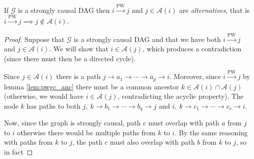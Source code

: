 \documentclass[12pt]{article}
\def\pwgc{\overset{\text{PW}}{\rightarrow}}  %
\def\gcg{\mathcal{G}}  %
\newcommand{\anc}[1]{\mathcal{A}(#1)}  %
\newcommand{\gcgpath}[4]{#1 \rightarrow #2_1 \rightarrow \cdots \rightarrow #2_{#3} \rightarrow #4}
\begin{document}


\begin{lemma}
  If $\gcg$ is a strongly causal DAG then $i \pwgc j$ and $j \in \anc{i}$ are
  \textit{alternatives}, that is $i \pwgc j \implies j \notin \anc{i}$.
\end{lemma}
\begin{proof}
  Suppose that $\gcg$ is a strongly causal DAG and that we have both
  $i \pwgc j$ and $j \in \anc{i}$.  We will show that $i \in \anc{j}$,
  which produces a contradiction (since there must then be a directed cycle).

  Since $j \in \anc{i}$ there is a path $\gcgpath{j}{a}{p}{i}$.
  Moreover, since $i \pwgc j$ by lemma \ref{lem:pwgc_anc} there must
  be a common ancestor $k \in \anc{i} \cap \anc{j}$ (otherwise, we would
  have $i \in \anc{j}$, contradicting the acyclic property).  The node
  $k$ has paths to both $j,\ \gcgpath{k}{b}{q}{j}$ and $i,\ \gcgpath{k}{c}{r}{i}$.

  Now, since the graph is strongly causal, path $c$ must overlap with
  path $a$ from $j$ to $i$ otherwise there would be multiple paths
  from $k$ to $i$.  By the same reasoning with paths from $k$ to $j$,
  the path $c$ must also overlap with path $b$ from $k$ to $j$, so in
  fact 

\end{proof}
\end{document}
